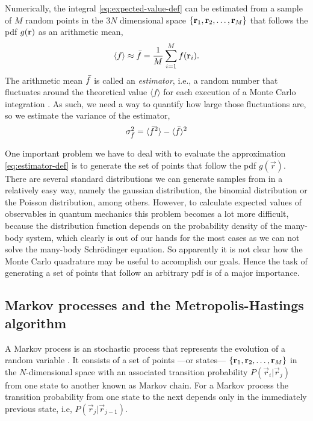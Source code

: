 Numerically, the integral \eqref{eq:expected-value-def} can be estimated from a
sample of $M$ random points in the $3N$ dimensional space $\{\mathbf{r}_1, \mathbf{r}_2,
\ldots, \mathbf{r}_M\}$ that follows the pdf $g(\mathbf{r})$ as an arithmetic mean,
%
\begin{equation}
	\label{eq:estimator-def}
	\langle f \rangle \approx \estimator{f} = \frac{1}{M} \sum_{i=1}^{M} f(\vecr_i).
\end{equation}
%
The arithmetic mean $\bar{f}$ is called an \textit{estimator}, i.e., a
random number that fluctuates around the theoretical value $\langle f \rangle$
for each execution of a Monte Carlo integration \cite{bib:janke.2002}. As such,
we need a way to quantify how large those fluctuations are, so we estimate the
variance of the estimator,
%
\begin{equation}
	\label{eq:estimator-variance-def}
	\var[\estimator{f}] = \langle \estimator{f}^2 \rangle - \langle \estimator{f} \rangle^2
\end{equation}

One important problem we have to deal with to evaluate the approximation
\eqref{eq:estimator-def} is to generate the set of points that follow the pdf
$g(\vec r)$. There are several standard distributions we can generate samples
from in a relatively easy way, namely the gaussian distribution, the binomial
distribution or the Poisson distribution, among others. However, to calculate
expected values of observables in quantum mechanics this problem becomes a lot
more difficult, because the distribution function depends on the probability
density of the many-body system, which clearly is out of our hands for the most
cases as we can not solve the many-body Schrödinger equation. So apparently it
is not clear how the Monte Carlo quadrature may be useful to accomplish our
goals. Hence the task of generating a set of points that follow an arbitrary pdf
is of a major importance.


\subsection{Markov processes and the Metropolis-Hastings algorithm}

A Markov process is an stochastic process that represents the evolution of a
random variable \cite{bib:toulouse-adv-quant-chem.73.2016}. It consists of a set
of points ---or states--- $\{\mathbf{r}_1, \mathbf{r}_2, \ldots, \mathbf{r}_M\}$ in the
$N$-dimensional space with an associated transition probability $P(\vec r_i |
\vec r_{j})$ from one state to another known as Markov chain. For a Markov
process the transition probability from one state to the next depends only in
the immediately previous state, i.e, $P(\vec r_j | \vec r_{j-1})$.

